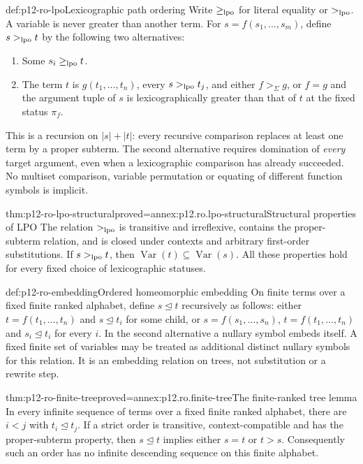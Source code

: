 \begin{hbdefinition}{def:p12-ro-lpo}{Lexicographic path ordering}
Write \(\geq_{\rm lpo}\) for literal equality or \(>_{\rm lpo}\).
A variable is never greater than another term. For
\(s=f(s_1,\ldots,s_m)\), define \(s>_{\rm lpo}t\) by the
following two alternatives:
\begin{enumerate}
\item Some \(s_i\geq_{\rm lpo}t\).
\item The term \(t\) is \(g(t_1,\ldots,t_n)\), every
      \(s>_{\rm lpo}t_j\), and either \(f>_\Sigma g\), or
      \(f=g\) and the argument tuple of \(s\) is lexicographically
      greater than that of \(t\) at the fixed status \(\pi_f\).
\end{enumerate}
This is a recursion on \(\lvert s\rvert+\lvert t\rvert\): every
recursive comparison replaces at least one term by a proper subterm.
The second alternative requires domination of \emph{every} target
argument, even when a lexicographic comparison has already succeeded.
No multiset comparison, variable permutation or equating of different
function symbols is implicit.
\end{hbdefinition}

\begin{hblemma}{thm:p12-ro-lpo-structural}{proved=annex:p12.ro.lpo-structural}{Structural properties of LPO}
The relation \(>_{\rm lpo}\) is transitive and irreflexive, contains
the proper-subterm relation, and is closed under contexts and arbitrary
first-order substitutions. If \(s>_{\rm lpo}t\), then
\(\operatorname{Var}(t)\subseteq\operatorname{Var}(s)\).
All these properties hold for every fixed choice of lexicographic statuses.
\end{hblemma}

\begin{hbdefinition}{def:p12-ro-embedding}{Ordered homeomorphic embedding}
On finite terms over a fixed finite ranked alphabet, define
\(s\unlhd t\) recursively as follows: either
\(t=f(t_1,\ldots,t_n)\) and \(s\unlhd t_i\) for some child,
or \(s=f(s_1,\ldots,s_n)\), \(t=f(t_1,\ldots,t_n)\) and
\(s_i\unlhd t_i\) for every \(i\). In the second alternative a
nullary symbol embeds itself. A fixed finite set of variables may be
treated as additional distinct nullary symbols for this relation.
It is an embedding relation on trees, not substitution or a rewrite step.
\end{hbdefinition}

\begin{hblemma}{thm:p12-ro-finite-tree}{proved=annex:p12.ro.finite-tree}{The finite-ranked tree lemma}
In every infinite sequence of terms over a fixed finite ranked alphabet,
there are \(i<j\) with \(t_i\unlhd t_j\).
If a strict order is transitive, context-compatible and has the
proper-subterm property, then \(s\unlhd t\) implies either
\(s=t\) or \(t>s\). Consequently such an order has no infinite
descending sequence on this finite alphabet.
\end{hblemma}

